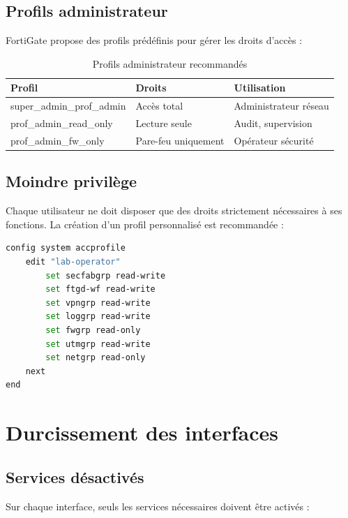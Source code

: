 \subsection{Profils administrateur}

FortiGate propose des profils prédéfinis pour gérer les droits d'accès :

\begin{table}[H]
\centering
\caption{Profils administrateur recommandés}
\label{tab:rbac}
\begin{tabularx}{\textwidth}{|l|X|X|}
\hline
\textbf{Profil} & \textbf{Droits} & \textbf{Utilisation} \\
\hline
super\_admin\_prof\_admin & Accès total & Administrateur réseau \\
\hline
prof\_admin\_read\_only & Lecture seule & Audit, supervision \\
\hline
prof\_admin\_fw\_only & Pare-feu uniquement & Opérateur sécurité \\
\hline
\end{tabularx}
\end{table}

\subsection{Moindre privilège}

Chaque utilisateur ne doit disposer que des droits strictement nécessaires à ses fonctions. La création d'un profil personnalisé est recommandée :

\begin{lstlisting}[language=bash, caption={Création d'un profil personnalisé}]
config system accprofile
    edit "lab-operator"
        set secfabgrp read-write
        set ftgd-wf read-write
        set vpngrp read-write
        set loggrp read-write
        set fwgrp read-only
        set utmgrp read-write
        set netgrp read-only
    next
end
\end{lstlisting}

\section{Durcissement des interfaces}

\subsection{Services désactivés}

Sur chaque interface, seuls les services nécessaires doivent être activés :

